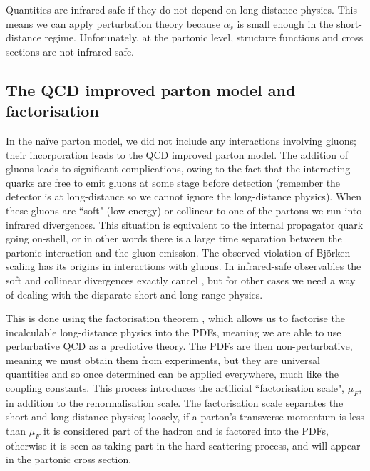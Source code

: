 
Quantities are infrared safe if they do not depend on long-distance physics. This means we can apply perturbation theory because $\alpha_s$ is small enough in the short-distance regime. Unforunately, at the partonic level, structure functions and cross sections are not infrared safe. 

\subsection{The QCD improved parton model and factorisation}

In the na\"ive parton model, we did not include any interactions involving gluons; their incorporation leads to the QCD improved parton model. The addition of gluons leads to significant complications, owing to the fact that the interacting quarks are free to emit gluons at some stage before detection (remember the detector is at long-distance so we cannot ignore the long-distance physics). When these gluons are ``soft" (low energy) or collinear to one of the partons we run into infrared divergences. This situation is equivalent to the internal propagator quark going on-shell, or in other words there is a large time separation between the partonic interaction and the gluon emission. The observed violation of Bj\"orken scaling has its origins in interactions with gluons. In infrared-safe observables the soft and collinear divergences exactly cancel \cite{Kinoshita:1962ur, Lee:1964is}, but for other cases we need a way of dealing with the disparate short and long range physics. 

This is done using the factorisation theorem \cite{Collins:1989gx}, which allows us to factorise the incalculable long-distance physics into the PDFs, meaning we are able to use perturbative QCD as a predictive theory. The PDFs are then non-perturbative, meaning we must obtain them from experiments, but they are universal quantities and so once determined can be applied everywhere, much like the coupling constants. This process introduces the artificial ``factorisation scale", $\mu_F$, in addition to the renormalisation scale. The factorisation scale separates the short and long distance physics; loosely, if a parton's transverse momentum is less than $\mu_F$ it is considered part of the hadron and is factored into the PDFs, otherwise it is seen as taking part in the hard scattering process, and will appear in the partonic cross section.

